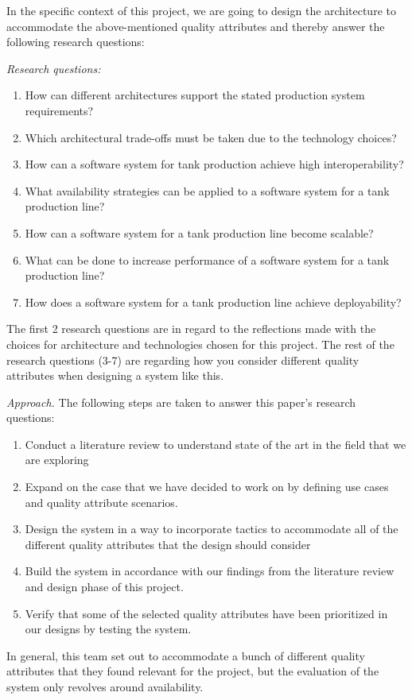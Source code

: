 In the specific context of this project, we are going to design the architecture to accommodate the above-mentioned quality attributes and thereby answer the following research questions:

\emph{Research questions:}
\begin{enumerate}
    \item How can different architectures support the stated production system requirements?
    \item Which architectural trade-offs must be taken due to the technology choices?
    \item How can a software system for tank production achieve high interoperability?
    \item What availability strategies can be applied to a software system for a tank production line?
    \item How can a software system for a tank production line become scalable? 
    \item What can be done to increase performance of a software system for a tank production line?
    \item How does a software system for a tank production line achieve deployability?
\end{enumerate}
The first 2 research questions are in regard to the reflections made with the choices for architecture and technologies chosen for this project.
The rest of the research questions (3-7) are regarding how you consider different quality attributes when designing a system like this. 

\emph{Approach.}
The following steps are taken to answer this paper's research questions: 
\begin{enumerate}
    \item Conduct a literature review to understand state of the art in the field that we are exploring
    \item  Expand on the case that we have decided to work on by defining use cases and quality attribute scenarios.
    \item Design the system in a way to incorporate tactics to accommodate all of the different quality attributes that the design should consider
    \item Build the system in accordance with our findings from the literature review and design phase of this project. 
    \item Verify that some of the selected quality attributes have been prioritized in our designs by testing the system.
\end{enumerate}

In general, this team set out to accommodate a bunch of different quality attributes that they found relevant for the project, but the evaluation of the system only revolves around availability.


